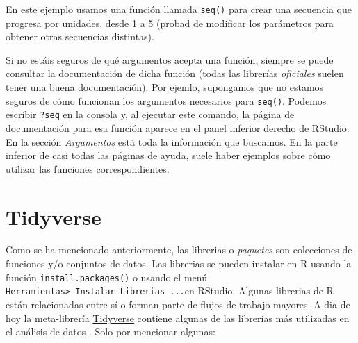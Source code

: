 \documentclass[
]{book}
\begin{document}
En este ejemplo usamos una función llamada \texttt{seq()} para crear una secuencia que progresa por unidades, desde 1 a 5 (probad de modificar los parámetros para obtener otras secuencias distintas).

Si no estáis seguros de qué argumentos acepta una función, siempre se puede consultar la documentación de dicha función (todas las librerías \emph{oficiales} suelen tener una buena documentación). Por ejemlo, supongamos que no estamos seguros de cómo funcionan los argumentos necesarios para \texttt{seq()}. Podemos escribir \texttt{?seq} en la consola y, al ejecutar este comando, la página de documentación para esa función aparece en el panel inferior derecho de RStudio. En la sección \emph{Argumentos} está toda la información que buscamos. En la parte inferior de casi todas las páginas de ayuda, suele haber ejemplos sobre cómo utilizar las funciones correspondientes.

\hypertarget{tidyverse}{%
\section{Tidyverse}\label{tidyverse}}

Como se ha mencionado anteriormente, las librerias o \emph{paquetes} son colecciones de funciones y/o conjuntos de datos. Las librerias se pueden instalar en R usando la función \texttt{install.packages()} o usando el menú \texttt{Herramientas\textgreater{}\ Instalar\ Librerias\ ...}en RStudio.
Algunas librerias de R están relacionadas entre sí o forman parte de flujos de trabajo mayores. A dia de hoy la meta-librería \href{https://www.tidyverse.org/}{Tidyverse} contiene algunas de las librerías más utilizadas en el análisis de datos \citep{wickham2019tidyverse}. Solo por mencionar algunas:
\end{document}
